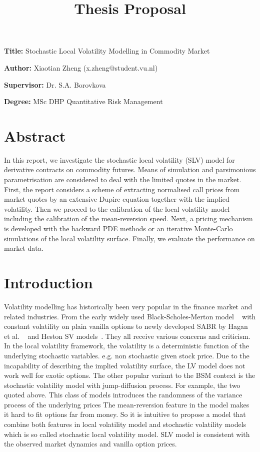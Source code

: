 \documentclass[12pt, a4paper]{article}
\title{Thesis Proposal}
\author{}
\date{}
\newcommand{\namelistlabel}[1]{\mbox{#1}\hfil}
\newenvironment{namelist}[1]{%
\begin{list}{}
    {
        \let\makelabel\namelistlabel
        \settowidth{\labelwidth}{#1}
        \setlength{\leftmargin}{1.1\labelwidth}
    }
  }{%
\end{list}}
\begin{document}
\maketitle

\begin{namelist}{xxxxxxxxxxxx}
\item[{\bf Title:}]
	Stochastic Local Volatility Modelling in Commodity Market
\item[{\bf Author:}]
	Xiaotian Zheng (x.zheng@student.vu.nl)
\item[{\bf Supervisor:}]
         Dr. S.A. Borovkova
\item[{\bf Degree:}]
	MSc DHP Quantitative Risk Management 
\end{namelist}

\section*{Abstract} 
In this report, we investigate the stochastic local volatility (SLV) model for derivative contracts on commodity futures. Means of simulation and parsimonious parametrisation are considered to deal with the limited quotes in the market. First, the report considers a scheme of extracting normalised call prices from market quotes by an extensive Dupire equation together with the implied volatility. Then we proceed to the calibration of the local volatility model including the calibration of the mean-reversion speed. Next, a pricing mechanism is developed with the backward PDE methods or an iterative Monte-Carlo simulations of the local volatility surface. Finally, we evaluate the performance on market data.

\section*{Introduction} 
Volatility modelling has historically been very popular in the finance market and related industries. From the early widely used Black-Scholes-Merton model ~\cite{BSM1973} with constant volatility on plain vanilla options to newly developed SABR by Hagan et al. ~\cite{Hagan2002} and Heston SV models~\cite{Heston93aclosed-form}. They all receive various concerns and criticism. In the local volatility framework, the volatility is a deterministic function of the underlying stochastic variables. e.g. non stochastic given stock price. Due to the incapability of describing the implied volatility surface, the LV model does not work well for exotic options. The other popular variant to the BSM context is the stochastic volatility model with jump-diffusion process. For example, the two quoted above. This class of models introduces the randomness of the variance process of the underlying prices The mean-reversion feature in the model makes it hard to fit options far from money. So it is intuitive to propose a model that combine both features in local volatility model and stochastic volatility models which is so called stochastic local volatility model. SLV model is consistent with the observed market dynamics and vanilla option prices.
 
\end{document}
